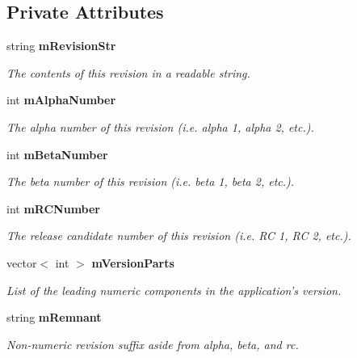 \subsection*{Private Attributes}
\begin{DoxyCompactItemize}
\item 
string {\bf mRevisionStr}\label{classRevision_a656395f0d475feaeffafbba5df0020a6}

\begin{DoxyCompactList}\small\item\em The contents of this revision in a readable string. \item\end{DoxyCompactList}\item 
int {\bf mAlphaNumber}\label{classRevision_ac0dfe73f7b931fa3d137731c79cc56b9}

\begin{DoxyCompactList}\small\item\em The alpha number of this revision (i.e. alpha 1, alpha 2, etc.). \item\end{DoxyCompactList}\item 
int {\bf mBetaNumber}\label{classRevision_a11e2f55468303ab147b3687e396831b1}

\begin{DoxyCompactList}\small\item\em The beta number of this revision (i.e. beta 1, beta 2, etc.). \item\end{DoxyCompactList}\item 
int {\bf mRCNumber}\label{classRevision_a94f3823f49575bc49e65a4060ac43b13}

\begin{DoxyCompactList}\small\item\em The release candidate number of this revision (i.e. RC 1, RC 2, etc.). \item\end{DoxyCompactList}\item 
vector$<$ int $>$ {\bf mVersionParts}\label{classRevision_af51623cfe1c58007d084cf37b187b705}

\begin{DoxyCompactList}\small\item\em List of the leading numeric components in the application's version. \item\end{DoxyCompactList}\item 
string {\bf mRemnant}\label{classRevision_ad28c9298fd8e834c0e7b1e35cef2948a}

\begin{DoxyCompactList}\small\item\em Non-\/numeric revision suffix aside from alpha, beta, and rc. \item\end{DoxyCompactList}\end{DoxyCompactItemize}


